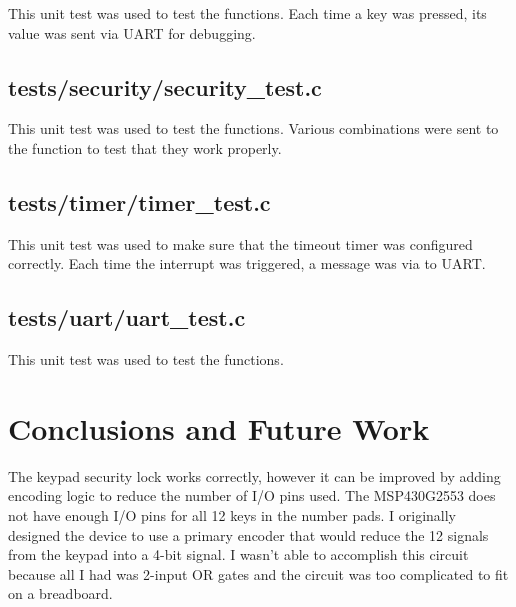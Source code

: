 \documentclass{article}
\begin{document}
This unit test was used to test the  functions. Each time a
key was pressed, its value was sent via UART for debugging.

\subsection{tests/security/security\_test.c}

This unit test was used to test the  functions. Various
 combinations were sent to the 
function to test that they work properly.

\subsection{tests/timer/timer\_test.c}

This unit test was used to make sure that the timeout timer was configured
correctly. Each time the interrupt was triggered, a message was via to UART.

\subsection{tests/uart/uart\_test.c}

This unit test was used to test the  functions.

\section{Conclusions and Future Work}

The keypad security lock works correctly, however it can be improved by adding
encoding logic to reduce the number of I/O pins used. The MSP430G2553 does not
have enough I/O pins for all 12 keys in the number pads. I originally designed
the device to use a primary encoder that would reduce the 12 signals from the
keypad into a 4-bit signal. I wasn't able to accomplish this circuit because all
I had was 2-input OR gates and the circuit was too complicated to fit on a
breadboard.
\end{document}

